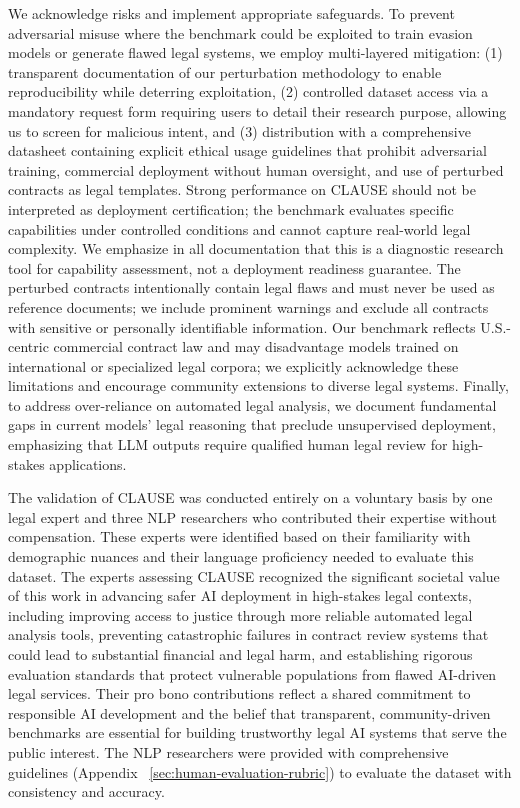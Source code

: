 \documentclass[11pt]{article}
\newcommand{\datasetName}{{\sc CLAUSE}\xspace}
\begin{document}
We acknowledge risks and implement appropriate safeguards. To prevent adversarial misuse where the benchmark could be exploited to train evasion models or generate flawed legal systems, we employ multi-layered mitigation: (1) transparent documentation of our perturbation methodology to enable reproducibility while deterring exploitation, (2) controlled dataset access via a mandatory request form requiring users to detail their research purpose, allowing us to screen for malicious intent, and (3) distribution with a comprehensive datasheet containing explicit ethical usage guidelines that prohibit adversarial training, commercial deployment without human oversight, and use of perturbed contracts as legal templates. Strong performance on \datasetName should not be interpreted as deployment certification; the benchmark evaluates specific capabilities under controlled conditions and cannot capture real-world legal complexity. We emphasize in all documentation that this is a diagnostic research tool for capability assessment, not a deployment readiness guarantee. The perturbed contracts intentionally contain legal flaws and must never be used as reference documents; we include prominent warnings and exclude all contracts with sensitive or personally identifiable information. Our benchmark reflects U.S.-centric commercial contract law and may disadvantage models trained on international or specialized legal corpora; we explicitly acknowledge these limitations and encourage community extensions to diverse legal systems. Finally, to address over-reliance on automated legal analysis, we document fundamental gaps in current models' legal reasoning that preclude unsupervised deployment, emphasizing that LLM outputs require qualified human legal review for high-stakes applications. 

The validation of \datasetName was conducted entirely on a voluntary basis by one legal expert and three NLP researchers who contributed their expertise without compensation. These experts were identified based on their familiarity with demographic nuances and their language proficiency needed to evaluate this dataset. The experts assessing \datasetName recognized the significant societal value of this work in advancing safer AI deployment in high-stakes legal contexts, including improving access to justice through more reliable automated legal analysis tools, preventing catastrophic failures in contract review systems that could lead to substantial financial and legal harm, and establishing rigorous evaluation standards that protect vulnerable populations from flawed AI-driven legal services. Their pro bono contributions reflect a shared commitment to responsible AI development and the belief that transparent, community-driven benchmarks are essential for building trustworthy legal AI systems that serve the public interest. The NLP researchers were provided with comprehensive guidelines (Appendix ~\ref{sec:human-evaluation-rubric}) to evaluate the dataset with consistency and accuracy.
\end{document}
